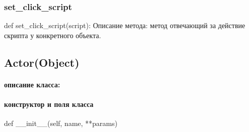 \subsubsection{set\_click\_script}
def set\_click\_script(script):
Описание метода: метод отвечающий за действие скрипта у конкретного объекта.

\subsection{Actor(Object)}
\paragraph{описание класса:}
\paragraph{конструктор и поля класса}
def \_\_init\_\_(self, name, **params)
